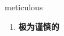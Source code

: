 
\begin{frame}
{\huge meticulous}
\begin{center}
\begin{enumerate}\Large
  \item \textbf{极为谨慎的}
\end{enumerate}
\end{center}
\end{frame}
